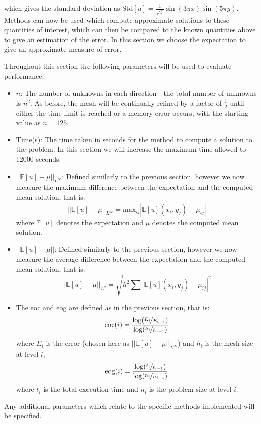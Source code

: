 \documentclass[11pt]{article}
\numberwithin{equation}{section}
\begin{document}
which gives the standard deviation as $\text{Std}[u] = \frac{1}{\sqrt{3}} \sin(3 \pi x) \sin(5 \pi y)$. Methods can now be used which compute approximate solutions to these quantities of interest, which can then be compared to the known quantities above to give an estimation of the error. In this section we choose the expectation to give an approximate measure of error.

Throughout this section the following parameters will be used to evaluate performance:
\begin{itemize}
\item $n$: The number of unknowns in each direction - the total number of unknowns is $n^2$. As before, the mesh will be continually refined by a factor of $\frac{1}{2}$ until either the time limit is reached or a memory error occurs, with the starting value as $n=125$.
\item Time(s): The time taken in seconds for the method to compute a solution to the problem. In this section we will increase the maximum time allowed to 12000 seconds. 
\item $|| \mathbb{E}[u] - \mu ||_{L^\infty} $: Defined similarly to the previous section, however we now measure the maximum difference between the expectation and the computed mean solution, that is:
 \[ || \mathbb{E}[u] - \mu ||_{L^\infty} = \text{max}_{ij} | \mathbb{E}[u](x_i,y_j) - \mu_{ij} | \]
where $\mathbb{E}[u]$ denotes the expectation and $\mu$ denotes the computed mean solution.
\item $\left|\left| \mathbb{E}[u] - \mu \right|\right|$: Defined similarly to the previous section, however we now measure the average difference between the expectation and the computed mean solution, that is:
\[ \left| \left| \mathbb{E}[u] - \mu \right| \right|_{L^2} = \sqrt{h^2 \sum \left| \mathbb{E}[u](x_i,y_j) - \mu_{ij} \right|^2} \]
\item The eoc and eog are defined as in the previous section, that is:
\[ \text{eoc}(i) = \frac{\log(\nicefrac{E_i}{E_{i-1}})}{\log(\nicefrac{h_i}{h_{i-1}})} \]
where $E_i$ is the error (chosen here as $|| \mathbb{E}[u] - \mu ||_{L^\infty}$) and $h_i$ is the mesh size at level $i$,
\[ \text{eog}(i) = \frac{\log(\nicefrac{t_{i}}{t_{i-1}})}{\log(\nicefrac{n_{i}}{n_{i-1}})} \]
where $t_i$ is the total execution time and $n_i$ is the problem size at level $i$.
\end{itemize}
Any additional parameters which relate to the specific methods implemented will be specified. 
\end{document}
